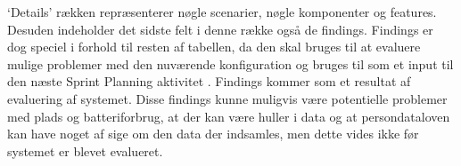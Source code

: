 `Details' rækken repræsenterer nøgle scenarier, nøgle komponenter og features.
Desuden indeholder det sidste felt i denne række også de findings.
Findings er dog speciel i forhold til resten af tabellen, da den skal bruges til at evaluere mulige problemer med den nuværende konfiguration og bruges til som et input til den næste Sprint Planning aktivitet \citet[Afsnit 8.5, Side 54]{art:essence}. 
Findings kommer som et resultat af evaluering af systemet. 
Disse findings kunne muligvis være potentielle problemer med plads og batteriforbrug, at der kan være huller i data og at persondataloven kan have noget af sige om den data der indsamles, men dette vides ikke før systemet er blevet evalueret. 
